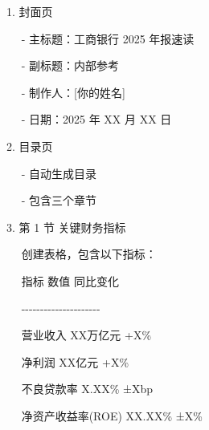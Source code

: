 \documentclass[
  american,
  chinese,
]{ctexart}
\begin{document}
\foreignlanguage{american}{1. }{\foreignlanguage{american}{封面页}}\foreignlanguage{american}{}

\foreignlanguage{american}{{~~ }- }{\foreignlanguage{american}{主标题：工商银行}}\foreignlanguage{american}{ 2025 }{\foreignlanguage{american}{年报速读}}\foreignlanguage{american}{}

\foreignlanguage{american}{{~~ }}\foreignlanguage{american}{- }{副标题：内部参考}\foreignlanguage{american}{}

\foreignlanguage{american}{{~~ }- }{制作人：}\foreignlanguage{american}{{[}}{你的姓名}\foreignlanguage{american}{{]}}

\foreignlanguage{american}{{~~ }- }{日期：}\foreignlanguage{american}{2025 }{年}\foreignlanguage{american}{ XX }{月}\foreignlanguage{american}{ XX }{日}\foreignlanguage{american}{}

\foreignlanguage{american}{2. }{目录页}\foreignlanguage{american}{}

\foreignlanguage{american}{{~~ }- }{自动生成目录}\foreignlanguage{american}{}

\foreignlanguage{american}{{~~ }- }{包含三个章节}\foreignlanguage{american}{}

\foreignlanguage{american}{3. }{第}\foreignlanguage{american}{ 1 }{节}{ }{关键财务指标}\foreignlanguage{american}{}

\foreignlanguage{american}{{~~ }}{创建表格，包含以下指标：}\foreignlanguage{american}{}

\foreignlanguage{american}{{~~ }\textbar{} }{指标}\foreignlanguage{american}{ \textbar{} }{数值}\foreignlanguage{american}{ \textbar{} }{同比变化}\foreignlanguage{american}{ \textbar{}}

\foreignlanguage{american}{{~~
}\textbar-\/-\/-\/-\/-\/-\textbar-\/-\/-\/-\/-\/-\textbar-\/-\/-\/-\/-\/-\/-\/-\/-\textbar{}}

\foreignlanguage{american}{{~~ }\textbar{} }{营业收入}\foreignlanguage{american}{ \textbar{} XX}{万亿元}\foreignlanguage{american}{ \textbar{} +X\% \textbar{}}

\foreignlanguage{american}{{~~ }\textbar{} }{净利润}\foreignlanguage{american}{ \textbar{} XX}{亿元}\foreignlanguage{american}{ \textbar{} +X\% \textbar{}}

\foreignlanguage{american}{{~~ }\textbar{} }{不良贷款率}\foreignlanguage{american}{ \textbar{} X.XX\% \textbar{} }{±}{\foreignlanguage{american}{Xbp}}\foreignlanguage{american}{ \textbar{}}

\foreignlanguage{american}{{~~ }\textbar{} }{净资产收益率}\foreignlanguage{american}{(ROE) \textbar{}
XX.XX\% \textbar{} }{±}\foreignlanguage{american}{X\% \textbar{}}
\end{document}
